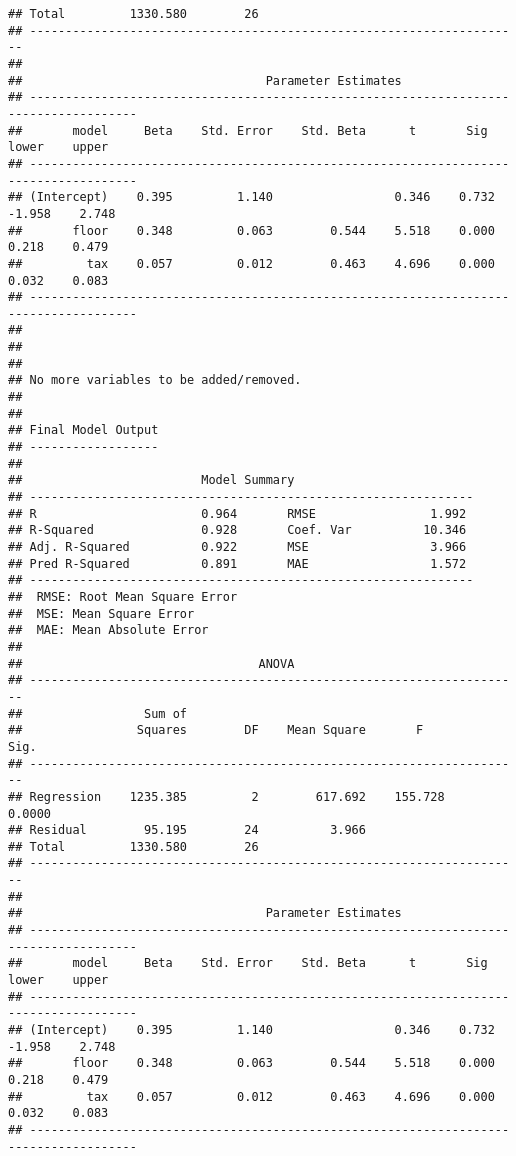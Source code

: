 \documentclass[
]{book}
\begin{document}
\begin{verbatim}
## Total         1330.580        26                                     
## ---------------------------------------------------------------------
## 
##                                  Parameter Estimates                                  
## -------------------------------------------------------------------------------------
##       model     Beta    Std. Error    Std. Beta      t       Sig      lower    upper 
## -------------------------------------------------------------------------------------
## (Intercept)    0.395         1.140                 0.346    0.732    -1.958    2.748 
##       floor    0.348         0.063        0.544    5.518    0.000     0.218    0.479 
##         tax    0.057         0.012        0.463    4.696    0.000     0.032    0.083 
## -------------------------------------------------------------------------------------
## 
## 
## 
## No more variables to be added/removed.
## 
## 
## Final Model Output 
## ------------------
## 
##                         Model Summary                          
## --------------------------------------------------------------
## R                       0.964       RMSE                1.992 
## R-Squared               0.928       Coef. Var          10.346 
## Adj. R-Squared          0.922       MSE                 3.966 
## Pred R-Squared          0.891       MAE                 1.572 
## --------------------------------------------------------------
##  RMSE: Root Mean Square Error 
##  MSE: Mean Square Error 
##  MAE: Mean Absolute Error 
## 
##                                 ANOVA                                 
## ---------------------------------------------------------------------
##                 Sum of                                               
##                Squares        DF    Mean Square       F         Sig. 
## ---------------------------------------------------------------------
## Regression    1235.385         2        617.692    155.728    0.0000 
## Residual        95.195        24          3.966                      
## Total         1330.580        26                                     
## ---------------------------------------------------------------------
## 
##                                  Parameter Estimates                                  
## -------------------------------------------------------------------------------------
##       model     Beta    Std. Error    Std. Beta      t       Sig      lower    upper 
## -------------------------------------------------------------------------------------
## (Intercept)    0.395         1.140                 0.346    0.732    -1.958    2.748 
##       floor    0.348         0.063        0.544    5.518    0.000     0.218    0.479 
##         tax    0.057         0.012        0.463    4.696    0.000     0.032    0.083 
## -------------------------------------------------------------------------------------
\end{verbatim}
\end{document}
